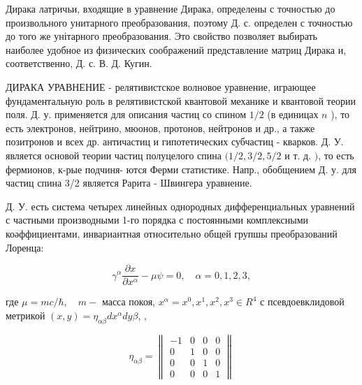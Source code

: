 \documentclass[10pt]{article}
\begin{document}
Дирака латричьи, входящие в уравнение Дирака, определены с точностью до произвольного унитарного преобразования, поэтому Д. с. определен с точностью до того же унітарного преобразования. Это свойство позволяет выбирать наиболее удобное из физических соображений представление матриц Дирака и, соответственно, Д. с. В. Д. Кугин.



ДИРАКА УРАВНЕНИЕ - релятивистское волновое уравнение, играющее фундаментальную роль в релятивистской квантовой механике и квантовой теории поля. Д. у. применяется для описания частиц со спином $1 / 2$ (в единицах $n$ ), то есть электронов, нейтрино, мюонов, протонов, нейтронов и др., а также позитронов и всех др. античастиц и гипотетических субчастиц - кварков. Д. У. является основой теории частиц полуцелого спина $(1 / 2,3 / 2,5 / 2$ и т. д. $)$, то есть фермионов, к-рые подчиня- ются Ферми статистике. Напр., обобщением Д. у. для частиц спина 3/2 является Рарита - Швингера уравнение.



Д. У. есть система четырех линейных однородных дифференциальных уравнений с частными производными 1-го порядка с постоянными комплексными коәффициентами, инвариантная относительно общей групшы преобразований Лоренца:



\[

\gamma^{\alpha} \frac{\partial x}{\partial x^{\alpha}}-\mu \psi=0, \quad \alpha=0,1,2,3,

\]



где $\mu=m c / \hbar, \quad m-$ масса покоя, $x^{\alpha}=x^{0}, x^{1}, x^{2}, x^{3} \in R^{4}$ с псевдоевклидовой метрикой $(x, y)=\eta_{\alpha \beta} d x^{\alpha} d y \beta$, ,



\[

\eta_{\alpha \beta}=\left\|\begin{array}{rrrr}

-1 & 0 & 0 & 0 \\

0 & 1 & 0 & 0 \\

0 & 0 & 1 & 0 \\

0 & 0 & 0 & 1

\end{array}\right\|

\]
\end{document}
